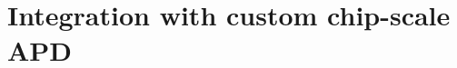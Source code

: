 \section{Integration with custom chip-scale APD}
\begin{comment}
\begin{figure} [ht]
\begin{center}
\begin{tabular}{c} 
\texttt{[image: images/APD-arch-ASTAR-1.jpg]}
\end{tabular}
\begin{tabular}{p{0.5\textwidth}>{c}p{0.5\textwidth}>{c}}
    (a) & (b) \\
\end{tabular}
\end{center}
\caption[] 
{ \label{fig:astar-apdarch} 
Two physical architectures of our custom chip-scale APD. (a) the wire-bonded package connects 8 out of the 16 on-chip APDs to pads which come out as pins of a standard DIP (dual-in-line package). (b) shows the bare chip with out any external packaging or interconnect. The N and P pads of the APDs can be connected directly with RF probe tips. The thin horizontal lines in both cases are optical waveguides for coupling light into the APDs.}
\end{figure} 
\begin{figure} [ht]
\begin{center}
\begin{tabular}{c} 
\texttt{[image: images/DIP-pkg-ASTAR-1.jpg]}
\end{tabular}
\begin{tabular}{p{0.33\textwidth}>{c}p{0.33\textwidth}>{c}p{0.33\textwidth}>{c}}
    (a) & & (b) \\
\end{tabular}
\end{center}
\caption[] 
{ \label{fig:astar-apddip} 
(a) shows the interface board developed to host and connect the DIP-based custom APD shown in figure \ref{fig:astar-apdarch}(a). The N and P pads of each APD come out into separate 4-pin headers. (b) shows the test setup with the APD interface board connecting APD 'D12' to channel 2 of the custom active quench board shown in figure \ref{fig:aq-pcb}, which in-turn connects with the commercial SoC board}
\end{figure}
\begin{figure} [ht]

\end{comment}
